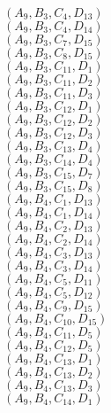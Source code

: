 \documentclass[14pt]{article}
\begin{document}
    $({A}_{9}, {B}_{3}, {C}_{4}, {D}_{13}) $ \\ 
    $({A}_{9}, {B}_{3}, {C}_{4}, {D}_{14}) $ \\ 
    $({A}_{9}, {B}_{3}, {C}_{7}, {D}_{15}) $ \\ 
    $({A}_{9}, {B}_{3}, {C}_{8}, {D}_{15}) $ \\ 
    $({A}_{9}, {B}_{3}, {C}_{11}, {D}_{1}) $ \\ 
    $({A}_{9}, {B}_{3}, {C}_{11}, {D}_{2}) $ \\ 
    $({A}_{9}, {B}_{3}, {C}_{11}, {D}_{3}) $ \\ 
    $({A}_{9}, {B}_{3}, {C}_{12}, {D}_{1}) $ \\ 
    $({A}_{9}, {B}_{3}, {C}_{12}, {D}_{2}) $ \\ 
    $({A}_{9}, {B}_{3}, {C}_{12}, {D}_{3}) $ \\ 
    $({A}_{9}, {B}_{3}, {C}_{13}, {D}_{4}) $ \\ 
    $({A}_{9}, {B}_{3}, {C}_{14}, {D}_{4}) $ \\ 
    $({A}_{9}, {B}_{3}, {C}_{15}, {D}_{7}) $ \\ 
    $({A}_{9}, {B}_{3}, {C}_{15}, {D}_{8}) $ \\ 
    $({A}_{9}, {B}_{4}, {C}_{1}, {D}_{13}) $ \\ 
    $({A}_{9}, {B}_{4}, {C}_{1}, {D}_{14}) $ \\ 
    $({A}_{9}, {B}_{4}, {C}_{2}, {D}_{13}) $ \\ 
    $({A}_{9}, {B}_{4}, {C}_{2}, {D}_{14}) $ \\ 
    $({A}_{9}, {B}_{4}, {C}_{3}, {D}_{13}) $ \\ 
    $({A}_{9}, {B}_{4}, {C}_{3}, {D}_{14}) $ \\ 
    $({A}_{9}, {B}_{4}, {C}_{5}, {D}_{11}) $ \\ 
    $({A}_{9}, {B}_{4}, {C}_{5}, {D}_{12}) $ \\ 
    $({A}_{9}, {B}_{4}, {C}_{9}, {D}_{15}) $ \\ 
    $({A}_{9}, {B}_{4}, {C}_{10}, {D}_{15}) $ \\ 
    $({A}_{9}, {B}_{4}, {C}_{11}, {D}_{5}) $ \\ 
    $({A}_{9}, {B}_{4}, {C}_{12}, {D}_{5}) $ \\ 
    $({A}_{9}, {B}_{4}, {C}_{13}, {D}_{1}) $ \\ 
    $({A}_{9}, {B}_{4}, {C}_{13}, {D}_{2}) $ \\ 
    $({A}_{9}, {B}_{4}, {C}_{13}, {D}_{3}) $ \\ 
    $({A}_{9}, {B}_{4}, {C}_{14}, {D}_{1}) $ \\ 
\end{document}
